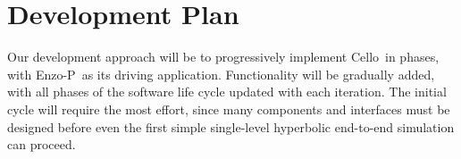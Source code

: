 \documentclass[11pt,letterpaper]{article}
\newcommand{\cello}{\textsf{Cello}}
\newcommand{\enzoii}{\textsf{Enzo-P}}
\begin{document}

\section{Development Plan} \label{s:plan}




Our development approach will be to progressively implement \cello\ in
phases, with \enzoii\ as its driving application.  Functionality will
be gradually added, with all phases of the software life cycle updated
with each iteration.  The initial cycle will require the most effort,
since many components and interfaces must be designed before even the
first simple single-level hyperbolic end-to-end simulation can
proceed.
\end{document}
